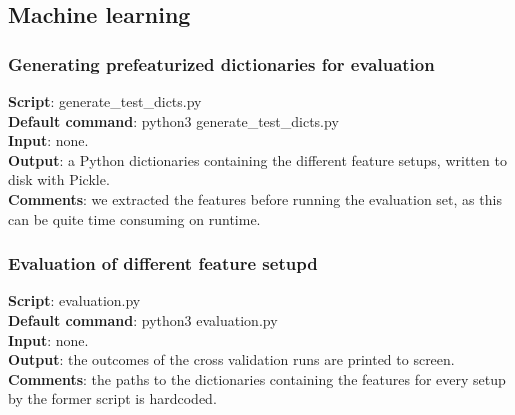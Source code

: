 \documentclass[
10pt, %
a4paper, %
oneside, %
headinclude,footinclude, %
] {book}%
\begin{document}
\subsection{\textbf{Machine learning}}
\subsubsection{Generating prefeaturized dictionaries for evaluation}
\textbf{Script}:	generate\_test\_dicts.py \\
\textbf{Default command}: python3 generate\_test\_dicts.py \\
\textbf{Input}:  none.  \\
\textbf{Output}:  a Python dictionaries containing the different feature setups, written to disk with Pickle. \\
\textbf{Comments}: we extracted the features before running the evaluation set, as this can be quite time consuming on runtime.

\subsubsection{Evaluation of different feature setupd}
\textbf{Script}:	evaluation.py \\
\textbf{Default command}: python3 evaluation.py \\
\textbf{Input}:  none.  \\
\textbf{Output}: the outcomes of the cross validation runs are printed to screen. \\
\textbf{Comments}: the paths to the dictionaries containing the features for every setup by the former script is hardcoded.
\end{document}
